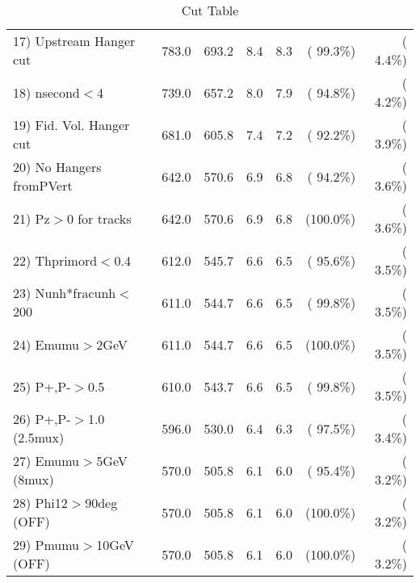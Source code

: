 \begin{table}[h!]
\begin{tabular}{||l||r|r|r|r|r|r||}
 17) Upstream Hanger cut  &        783.0 &        693.2 &          8.4 &          8.3 & ( 99.3\%) & (  4.4\%) \\
 18) nsecond$<$4          &        739.0 &        657.2 &          8.0 &          7.9 & ( 94.8\%) & (  4.2\%) \\
 19) Fid. Vol. Hanger cut &        681.0 &        605.8 &          7.4 &          7.2 & ( 92.2\%) & (  3.9\%) \\
 20) No Hangers fromPVert &        642.0 &        570.6 &          6.9 &          6.8 & ( 94.2\%) & (  3.6\%) \\
 21) Pz$>$0 for tracks    &        642.0 &        570.6 &          6.9 &          6.8 & (100.0\%) & (  3.6\%) \\
 22) Thprimord$<$0.4      &        612.0 &        545.7 &          6.6 &          6.5 & ( 95.6\%) & (  3.5\%) \\
 23) Nunh*fracunh$<$200   &        611.0 &        544.7 &          6.6 &          6.5 & ( 99.8\%) & (  3.5\%) \\
 24) Emumu$>$2GeV         &        611.0 &        544.7 &          6.6 &          6.5 & (100.0\%) & (  3.5\%) \\
 25) P+,P-$>$0.5          &        610.0 &        543.7 &          6.6 &          6.5 & ( 99.8\%) & (  3.5\%) \\
 26) P+,P-$>$1.0 (2.5mux) &        596.0 &        530.0 &          6.4 &          6.3 & ( 97.5\%) & (  3.4\%) \\
 27) Emumu$>$5GeV  (8mux) &        570.0 &        505.8 &          6.1 &          6.0 & ( 95.4\%) & (  3.2\%) \\
 28) Phi12$>$90deg  (OFF) &        570.0 &        505.8 &          6.1 &          6.0 & (100.0\%) & (  3.2\%) \\
 29) Pmumu$>$10GeV  (OFF) &        570.0 &        505.8 &          6.1 &          6.0 & (100.0\%) & (  3.2\%) \\
 \hline
 \hline
 \end{tabular}
 \caption{Cut Table           }
 \label{tab-cutcohjpsi-mumu_cohpip}
 \end{table}
